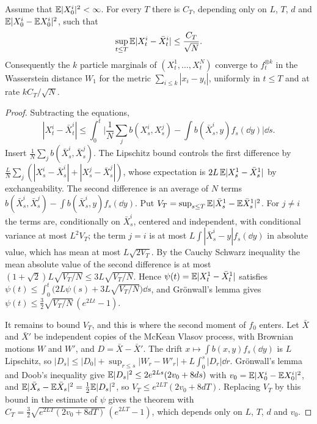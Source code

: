 \begin{theorem}
\label{thm:mckean}
Assume that $\mathbb{E}|X^i_0|^2<\infty$. For every $T$ there is $C_T$, depending only on $L$, $T$, $d$ and $\mathbb{E}|X^i_0-\mathbb{E} X^i_0|^2$, such that
\[
\sup_{t\leq T}\mathbb{E}|X^i_t-\bar X^i_t|\leq\frac{C_T}{\sqrt N}.
\]
Consequently the $k$ particle marginals of $(X^1_t,\dots,X^N_t)$ converge to $f_t^{\otimes k}$ in the Wasserstein distance $W_1$ for the metric $\sum_{i\leq k}|x_i-y_i|$, uniformly in $t\leq T$ and at rate $kC_T/\sqrt N$.
\end{theorem}

\begin{proof}
Subtracting the equations,
\[
|X^i_t-\bar X^i_t|\leq\int_0^t\Big|\frac1N\sum_jb(X^i_s,X^j_s)-\int b(\bar X^i_s,y)f_s(\dd y)\Big|\dd s.
\]
Insert $\frac1N\sum_jb(\bar X^i_s,\bar X^j_s)$. The Lipschitz bound controls the first difference by $\frac{L}{N}\sum_j(|X^i_s-\bar X^i_s|+|X^j_s-\bar X^j_s|)$, whose expectation is $2L\,\mathbb{E}|X^1_s-\bar X^1_s|$ by exchangeability. The second difference is an average of $N$ terms $b(\bar X^i_s,\bar X^j_s)-\int b(\bar X^i_s,y)f_s(\dd y)$. Put $V_T = \sup_{s\leq T}\mathbb{E}|\bar X^1_s-\mathbb{E}\bar X^1_s|^2$. For $j\neq i$ the terms are, conditionally on $\bar X^i_s$, centered and independent, with conditional variance at most $L^2V_T$; the term $j = i$ is at most $L\int|\bar X^i_s-y|f_s(\dd y)$ in absolute value, which has mean at most $L\sqrt{2V_T}$. By the Cauchy Schwarz inequality the mean absolute value of the second difference is at most $(1+\sqrt2)L\sqrt{V_T/N}\leq3L\sqrt{V_T/N}$. Hence $\psi(t) = \mathbb{E}|X^1_t-\bar X^1_t|$ satisfies $\psi(t)\leq\int_0^t\big(2L\psi(s)+3L\sqrt{V_T/N}\big)\dd s$, and Gr\"onwall's lemma gives $\psi(t)\leq\frac32\sqrt{V_T/N}\,(e^{2Lt}-1)$.

It remains to bound $V_T$, and this is where the second moment of $f_0$ enters. Let $\bar X$ and $\bar X'$ be independent copies of the McKean Vlasov process, with Brownian motions $W$ and $W'$, and $D = \bar X-\bar X'$. The drift $x\mapsto\int b(x,y)f_s(\dd y)$ is $L$ Lipschitz, so $|D_s|\leq|D_0|+\sup_{r\leq s}|W_r-W'_r|+L\int_0^s|D_r|\dd r$. Gr\"onwall's lemma and Doob's inequality give $\mathbb{E}|D_s|^2\leq2e^{2Ls}(2v_0+8ds)$ with $v_0 = \mathbb{E}|X^i_0-\mathbb{E} X^i_0|^2$, and $\mathbb{E}|\bar X_s-\mathbb{E}\bar X_s|^2 = \frac12\mathbb{E}|D_s|^2$, so $V_T\leq e^{2LT}(2v_0+8dT)$. Replacing $V_T$ by this bound in the estimate of $\psi$ gives the theorem with $C_T = \frac32\sqrt{e^{2LT}(2v_0+8dT)}\,(e^{2LT}-1)$, which depends only on $L$, $T$, $d$ and $v_0$.
\end{proof}

